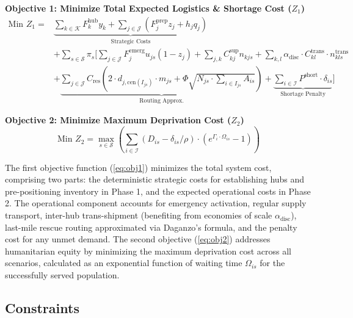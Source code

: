 \textbf{Objective 1: Minimize Total Expected Logistics \& Shortage Cost ($Z_1$)}
\begin{equation} \label{eq:obj1}
\begin{aligned}
    \text{Min } Z_1 = & \underbrace{\sum_{k \in \mathcal{K}} F_k^{\text{hub}} y_k + \sum_{j \in \mathcal{J}} (F_j^{\text{prep}} z_j + h_j q_j)}_{\text{Strategic Costs}} \\
    & + \sum_{s \in \mathcal{S}} \pi_s \Bigg[ \sum_{j \in \mathcal{J}} F_j^{\text{emerg}} u_{js}(1 - z_j) 
    + \sum_{j,k} C_{kj}^{\text{sup}} n_{kjs} 
    + \sum_{k,l} \alpha_{\text{disc}} \cdot C_{kl}^{\text{trans}} \cdot n_{kls}^{\text{trans}} \\
    & + \underbrace{\sum_{j \in \mathcal{J}} C_{\text{res}} \left( 2 \cdot d_{j, \text{cen}(I_{js})} \cdot m_{js} + \Phi \sqrt{N_{js} \cdot \sum_{i \in I_{js}} A_{is}} \right)}_{\text{Routing Approx.}} 
    + \underbrace{\sum_{i \in \mathcal{I}} P^{\text{short}} \cdot \delta_{is}}_{\text{Shortage Penalty}} \Bigg]
\end{aligned}
\end{equation}

\textbf{Objective 2: Minimize Maximum Deprivation Cost ($Z_2$)}
\begin{equation} \label{eq:obj2}
    \text{Min } Z_2 = \max_{s \in \mathcal{S}} \left( \sum_{i \in \mathcal{I}} (D_{is} - \delta_{is}/\rho) \cdot \left( e^{\Gamma_i \cdot \Omega_{is}} - 1 \right) \right)
\end{equation}

\noindent The first objective function (\ref{eq:obj1}) minimizes the total system cost, comprising two parts: the deterministic strategic costs for establishing hubs and pre-positioning inventory in Phase 1, and the expected operational costs in Phase 2. The operational component accounts for emergency activation, regular supply transport, inter-hub trans-shipment (benefiting from economies of scale $\alpha_{\text{disc}}$), last-mile rescue routing approximated via Daganzo's formula, and the penalty cost for any unmet demand. The second objective (\ref{eq:obj2}) addresses humanitarian equity by minimizing the maximum deprivation cost across all scenarios, calculated as an exponential function of waiting time $\Omega_{is}$ for the successfully served population.

\subsection{Constraints}

